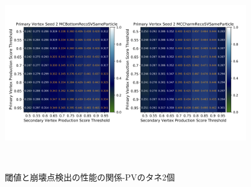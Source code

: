 \begin{figure}[htbp]
   \begin{minipage}{1.0\textwidth}
   \centering
    \includegraphics[trim = 0 140 0 140, width=0.95\textwidth, clip]{Figure/4VertexFinderwithDL/4-2-2-3TrackEfficiencySameParticle.png}
   \end{minipage} 
  \caption{閾値と崩壊点検出の性能の関係-PVのタネ2個}
  \label{4-2-2-3TrackEfficiency}
\end{figure}

